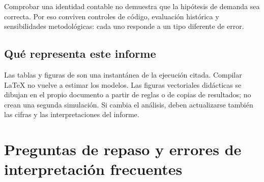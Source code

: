 Comprobar una identidad contable no demuestra que la hipótesis de demanda sea
correcta. Por eso conviven controles de código, evaluación histórica y
sensibilidades metodológicas: cada uno responde a un tipo diferente de error.

\subsection{Qué representa este informe}
Las tablas y figuras de  son una instantánea de la ejecución
citada. Compilar LaTeX no vuelve a estimar los modelos. Las figuras vectoriales
didácticas se dibujan en el propio documento a partir de reglas o de copias de
resultados; no crean una segunda simulación. Si cambia el análisis, deben
actualizarse también las cifras y las interpretaciones del informe.

\section{Preguntas de repaso y errores de interpretación frecuentes}\label{anexo:repaso}

